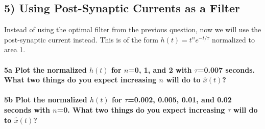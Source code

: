 \documentclass{article}
\begin{document}
    \subsection{5) Using Post-Synaptic Currents as a
Filter}\label{using-post-synaptic-currents-as-a-filter}

Instead of using the optimal filter from the previous question, now we
will use the post-synaptic current instead. This is of the form
$h(t)=t^n e^{-t/\tau}$ normalized to area 1.

    \paragraph{5a Plot the normalized $h(t)$ for $n$=0, 1, and 2 with
$\tau$=0.007 seconds. What two things do you expect increasing $n$ will
do to
$\hat{x}(t)$?}\label{a-plot-the-normalized-ht-for-n0-1-and-2-with-tau0.007-seconds.-what-two-things-do-you-expect-increasing-n-will-do-to-hatxt}

    \paragraph{5b Plot the normalized $h(t)$ for $\tau$=0.002, 0.005, 0.01,
and 0.02 seconds with $n$=0. What two things do you expect increasing
$\tau$ will do to
$\hat{x}(t)$?}\label{b-plot-the-normalized-ht-for-tau0.002-0.005-0.01-and-0.02-seconds-with-n0.-what-two-things-do-you-expect-increasing-tau-will-do-to-hatxt}
\end{document}

